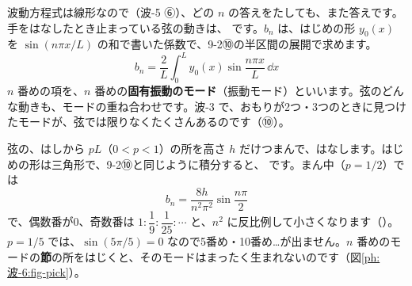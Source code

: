 波動方程式は線形なので（波-5 ⑥）、どの $n$ の答えをたしても、また答えです。手をはなしたとき止まっている弦の動きは、
です。$b_n$ は、はじめの形 $y_0(x)$ を $\sin(n\pi x/L)$ の和で書いた係数で、9-2⑩の半区間の展開で求めます。
\[b_n=\frac{2}{L}\int_0^Ly_0(x)\sin\frac{n\pi x}{L}\,\dd x\]
$n$ 番めの項を、$n$ 番めの\textbf{固有振動のモード}（振動モード）といいます。弦のどんな動きも、モードの重ね合わせです。波-3 で、おもりが2つ・3つのときに見つけたモードが、弦では限りなくたくさんあるのです（⑩）。

弦の、はしから $pL$（$0<p<1$）の所を高さ $h$ だけつまんで、はなします。はじめの形は三角形で、9-2⑩と同じように積分すると、
です。まん中（$p=1/2$）では
\[b_n=\frac{8h}{n^2\pi^2}\sin\frac{n\pi}{2}\]
で、偶数番が0、奇数番は $1:\dfrac19:\dfrac{1}{25}:\cdots$ と、$n^2$ に反比例して小さくなります（）。$p=1/5$ では、$\sin(5\pi/5)=0$ なので5番め・10番め…が出ません。$n$ 番めのモードの\textbf{節}の所をはじくと、そのモードはまったく生まれないのです（図\ref{ph:波-6:fig-pick}）。

\begin{bkfigure}
\label{ph:波-6:fig-pick}
\end{bkfigure}

\begin{phflow}[はじいた弦]
\end{phflow}

